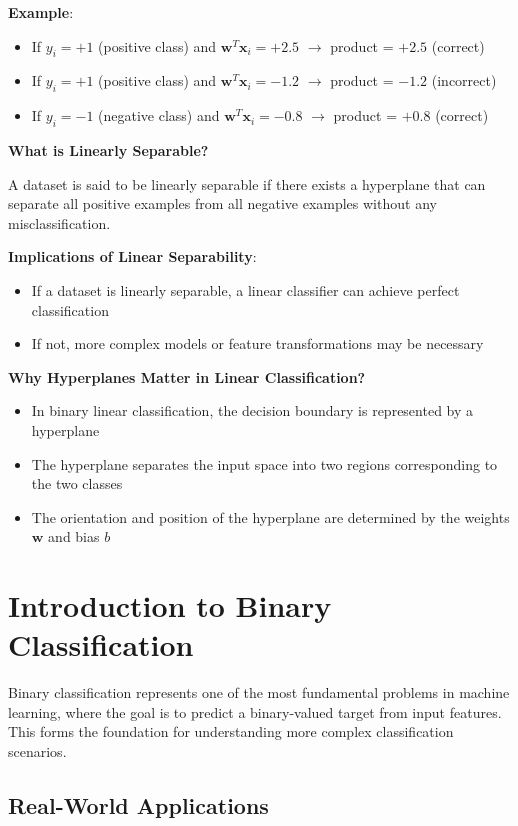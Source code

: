 \textbf{Example}: 
\begin{itemize}
    \item If $y_i = +1$ (positive class) and $\mathbf{w}^T \mathbf{x}_i = +2.5$ $\rightarrow$ product = $+2.5$ (correct)
    \item If $y_i = +1$ (positive class) and $\mathbf{w}^T \mathbf{x}_i = -1.2$ $\rightarrow$ product = $-1.2$ (incorrect)
    \item If $y_i = -1$ (negative class) and $\mathbf{w}^T \mathbf{x}_i = -0.8$ $\rightarrow$ product = $+0.8$ (correct)
\end{itemize}


\textbf{What is Linearly Separable?}
\begin{definition}
A dataset is said to be linearly separable if there exists a hyperplane that can separate all positive examples from all negative examples without any misclassification.
\end{definition}
\textbf{Implications of Linear Separability}:
\begin{itemize}
    \item If a dataset is linearly separable, a linear classifier can achieve perfect classification
    \item If not, more complex models or feature transformations may be necessary
\end{itemize}   
\textbf{Why Hyperplanes Matter in Linear Classification?}
\begin{itemize}
    \item In binary linear classification, the decision boundary is represented by a hyperplane
    \item The hyperplane separates the input space into two regions corresponding to the two classes
    \item The orientation and position of the hyperplane are determined by the weights $\bm{w}$ and bias $b$
\end{itemize}

\section{Introduction to Binary Classification}

Binary classification represents one of the most fundamental problems in machine learning, where the goal is to predict a binary-valued target from input features. This forms the foundation for understanding more complex classification scenarios.

\subsection{Real-World Applications}

